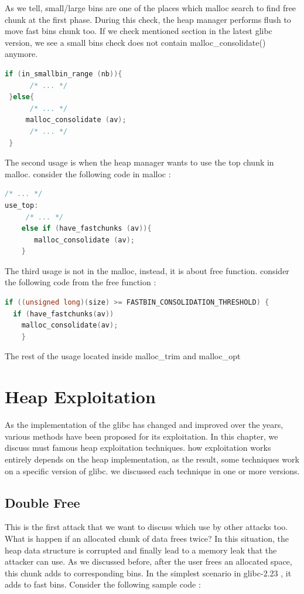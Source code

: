 \documentclass{masterthesis}
\newcommand*\libc{glibc}
\newcommand*\fb{fast bins}
\newcommand*\lb{large bins}
\newcommand*\sbs{small bins}
\begin{document}
As we tell, small/\lb{} are one of the places which malloc search to find free chunk at the first phase. During this check, the heap manager performs flush to move \fb{} chunk too. If we check mentioned section in the latest \libc{} version, we see a \sbs{} check does not contain malloc\_consolidate() anymore.

\begin{lstlisting}[language=c,frame=tlrb]
 if (in_smallbin_range (nb)){
 	  /* ... */ 
 }else{
	  /* ... */ 
	 malloc_consolidate (av);
	  /* ... */ 
 }
\end{lstlisting}

The second usage is when the heap manager wants to use the top chunk in malloc. consider the following code in malloc :

\begin{lstlisting}[language=c,frame=tlrb]
 /* ... */ 
use_top:
	 /* ... */ 
	else if (have_fastchunks (av)){
	   malloc_consolidate (av);
	}
\end{lstlisting}

The third usage is not in the malloc, instead, it is about free function. consider the following code from the free function :

\begin{lstlisting}[language=c,frame=tlrb]
if ((unsigned long)(size) >= FASTBIN_CONSOLIDATION_THRESHOLD) {
  if (have_fastchunks(av))
	malloc_consolidate(av);
	}
\end{lstlisting}

The rest of the usage located inside malloc\_trim and malloc\_opt

\chapter{Heap Exploitation }

As the implementation of the \libc{} has changed and improved over the years, various methods have been proposed for its exploitation. In this chapter, we discuss must famous heap exploitation techniques. how exploitation works entirely depends on the heap implementation, as the result, some techniques work on a specific version of \libc{}. we discussed each technique in one or more versions.

\section{Double Free}
This is the first attack that we want to discuss which use by other attacks too. What is happen if an allocated chunk of data frees twice? In this situation, the heap data structure is corrupted and finally lead to a memory leak that the attacker can use. As we discussed before, after the user frees an allocated space, this chunk adds to corresponding bins. In the simplest scenario in \libc{-2.23} , it adds to \fb{}. Consider the following sample code :
\end{document}
